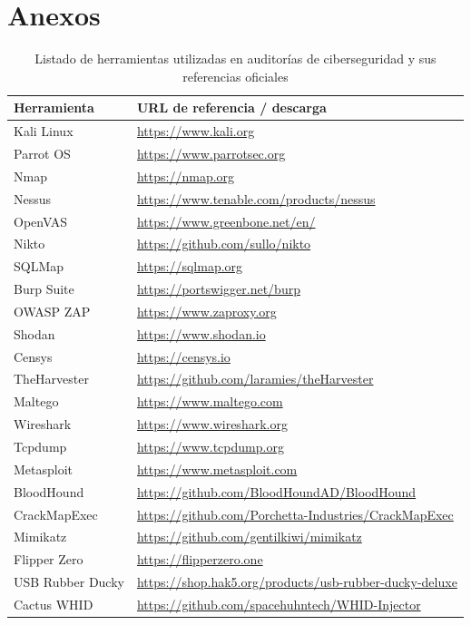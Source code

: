 \documentclass[a4paper, 10pt]{article}
\begin{document}
\section{Anexos}

\begin{table}[H]
\centering
\begin{tabular}{|p{4cm}|p{8cm}|}
\hline
\textbf{Herramienta} & \textbf{URL de referencia / descarga} \\
\hline
Kali Linux & \url{https://www.kali.org} \\
Parrot OS & \url{https://www.parrotsec.org} \\
Nmap & \url{https://nmap.org} \\
Nessus & \url{https://www.tenable.com/products/nessus} \\
OpenVAS & \url{https://www.greenbone.net/en/} \\
Nikto & \url{https://github.com/sullo/nikto} \\
SQLMap & \url{https://sqlmap.org} \\
Burp Suite & \url{https://portswigger.net/burp} \\
OWASP ZAP & \url{https://www.zaproxy.org} \\
Shodan & \url{https://www.shodan.io} \\
Censys & \url{https://censys.io} \\
TheHarvester & \url{https://github.com/laramies/theHarvester} \\
Maltego & \url{https://www.maltego.com} \\
Wireshark & \url{https://www.wireshark.org} \\
Tcpdump & \url{https://www.tcpdump.org} \\
Metasploit & \url{https://www.metasploit.com} \\
BloodHound & \url{https://github.com/BloodHoundAD/BloodHound} \\
CrackMapExec & \url{https://github.com/Porchetta-Industries/CrackMapExec} \\
Mimikatz & \url{https://github.com/gentilkiwi/mimikatz} \\
Flipper Zero & \url{https://flipperzero.one} \\
USB Rubber Ducky & \url{https://shop.hak5.org/products/usb-rubber-ducky-deluxe} \\
Cactus WHID & \url{https://github.com/spacehuhntech/WHID-Injector} \\
\hline
\end{tabular}
\caption{Listado de herramientas utilizadas en auditorías de ciberseguridad y sus referencias oficiales}
\end{table}


\clearpage
\end{document}

